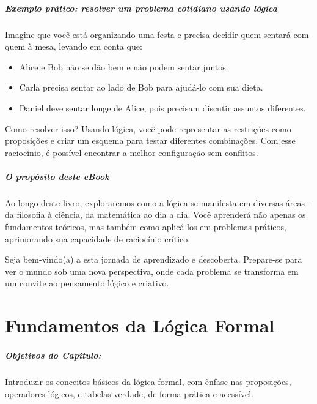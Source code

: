 \documentclass[a4paper,12pt]{book}
\begin{document}
\paragraph{Exemplo prático: resolver um problema cotidiano usando lógica}  
Imagine que você está organizando uma festa e precisa decidir quem sentará com quem à mesa, levando em conta que:  

\begin{itemize}  
    \item Alice e Bob não se dão bem e não podem sentar juntos.  
    \item Carla precisa sentar ao lado de Bob para ajudá-lo com sua dieta.  
    \item Daniel deve sentar longe de Alice, pois precisam discutir assuntos diferentes.  
\end{itemize}  

Como resolver isso? Usando lógica, você pode representar as restrições como proposições e criar um esquema para testar diferentes combinações. Com esse raciocínio, é possível encontrar a melhor configuração sem conflitos.  

\paragraph{O propósito deste eBook}  
Ao longo deste livro, exploraremos como a lógica se manifesta em diversas áreas – da filosofia à ciência, da matemática ao dia a dia. Você aprenderá não apenas os fundamentos teóricos, mas também como aplicá-los em problemas práticos, aprimorando sua capacidade de raciocínio crítico.  

Seja bem-vindo(a) a esta jornada de aprendizado e descoberta. Prepare-se para ver o mundo sob uma nova perspectiva, onde cada problema se transforma em um convite ao pensamento lógico e criativo.  



\chapter{Fundamentos da Lógica Formal}

\paragraph{Objetivos do Capitulo:}
Introduzir os conceitos básicos da lógica formal, com ênfase nas proposições, operadores lógicos, e tabelas-verdade, de forma prática e acessível.
\end{document}
